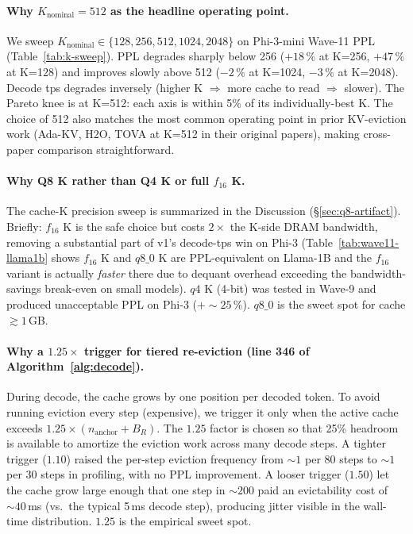 \documentclass[sigconf, anonymous=false, screen=true]{acmart}
\begin{document}
\paragraph{Why $K_{\text{nominal}} = 512$ as the headline operating point.}
We sweep $K_{\text{nominal}} \in \{128, 256, 512, 1024, 2048\}$ on Phi-3-mini Wave-11 PPL (Table~\ref{tab:k-sweep}). PPL degrades sharply below 256 ($+18\,\%$ at K=256, $+47\,\%$ at K=128) and improves slowly above 512 ($-2\,\%$ at K=1024, $-3\,\%$ at K=2048). Decode tps degrades inversely (higher K $\Rightarrow$ more cache to read $\Rightarrow$ slower). The Pareto knee is at K=512: each axis is within 5\% of its individually-best K. The choice of 512 also matches the most common operating point in prior KV-eviction work (Ada-KV, H2O, TOVA at K=512 in their original papers), making cross-paper comparison straightforward.

\paragraph{Why Q8 K rather than Q4 K or full $f_{16}$ K.}
The cache-K precision sweep is summarized in the Discussion (\S\ref{sec:q8-artifact}). Briefly: $f_{16}$ K is the safe choice but costs $2\times$ the K-side DRAM bandwidth, removing a substantial part of v1's decode-tps win on Phi-3 (Table~\ref{tab:wave11-llama1b} shows $f_{16}$ K and $q8\_0$ K are PPL-equivalent on Llama-1B and the $f_{16}$ variant is actually \emph{faster} there due to dequant overhead exceeding the bandwidth-savings break-even on small models). $q4$ K (4-bit) was tested in Wave-9 and produced unacceptable PPL on Phi-3 ($+\sim 25\,\%$). $q8\_0$ is the sweet spot for cache $\gtrsim 1$\,GB.

\paragraph{Why a $1.25\times$ trigger for tiered re-eviction (line 346 of Algorithm~\ref{alg:decode}).}
During decode, the cache grows by one position per decoded token. To avoid running eviction every step (expensive), we trigger it only when the active cache exceeds $1.25 \times (n_{\text{anchor}} + B_R)$. The $1.25$ factor is chosen so that 25\% headroom is available to amortize the eviction work across many decode steps. A tighter trigger ($1.10$) raised the per-step eviction frequency from $\sim 1$ per 80 steps to $\sim 1$ per 30 steps in profiling, with no PPL improvement. A looser trigger ($1.50$) let the cache grow large enough that one step in $\sim 200$ paid an evictability cost of $\sim 40$\,ms (vs.\ the typical 5\,ms decode step), producing jitter visible in the wall-time distribution. $1.25$ is the empirical sweet spot.
\end{document}
